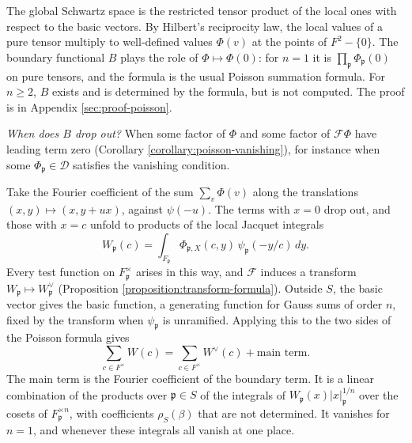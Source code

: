 
\begin{sketch}
  The global Schwartz space is the restricted tensor product of the local ones with respect to the basic vectors.  By Hilbert's reciprocity law, the local values of a pure tensor multiply to well-defined values $\Phi(v)$ at the points of $F^2 - \{0\}$.  The boundary functional $B$ plays the role of $\Phi \mapsto \Phi(0)$: for $n = 1$ it is $\prod_{\mathfrak{p}} \Phi_{\mathfrak{p}}(0)$ on pure tensors, and the formula is the usual Poisson summation formula.  For $n \geq 2$, $B$ exists and is determined by the formula, but is not computed.  The proof is in Appendix \ref{sec:proof-poisson}.

  \emph{When does $B$ drop out?}  When some factor of $\Phi$ and some factor of $\mathcal{F} \Phi$ have leading term zero (Corollary \ref{corollary:poisson-vanishing}), for instance when some $\Phi_{\mathfrak{p}} \in \mathcal{D}$ satisfies the vanishing condition.
\end{sketch}


\begin{sketch}
  Take the Fourier coefficient of the sum $\sum_v \Phi(v)$ along the translations $(x, y) \mapsto (x, y + u x)$, against $\psi(-u)$.  The terms with $x = 0$ drop out, and those with $x = c$ unfold to products of the local Jacquet integrals
  \[
    W_{\mathfrak{p}}(c) = \int_{F_{\mathfrak{p}}} \Phi_{\mathfrak{p}, X}(c, y) \, \psi_{\mathfrak{p}}(-y / c) \, d y.
  \]
  Every test function on $F_{\mathfrak{p}}^\times$ arises in this way, and $\mathcal{F}$ induces a transform $W_{\mathfrak{p}} \mapsto W_{\mathfrak{p}}^\vee$ (Proposition \ref{proposition:transform-formula}).  Outside $S$, the basic vector gives the basic function, a generating function for Gauss sums of order $n$, fixed by the transform when $\psi_{\mathfrak{p}}$ is unramified.  Applying this to the two sides of the Poisson formula gives
  \[
    \sum_{c \in F^\times} W(c) = \sum_{c \in F^\times} W^\vee(c) + \textrm{main term}.
  \]
  The main term is the Fourier coefficient of the boundary term.  It is a linear combination of the products over $\mathfrak{p} \in S$ of the integrals of $W_{\mathfrak{p}}(x) \lvert x \rvert_{\mathfrak{p}}^{1/n}$ over the cosets of $F_{\mathfrak{p}}^{\times n}$, with coefficients $\rho_S(\beta)$ that are not determined.  It vanishes for $n = 1$, and whenever these integrals all vanish at one place.
\end{sketch}

